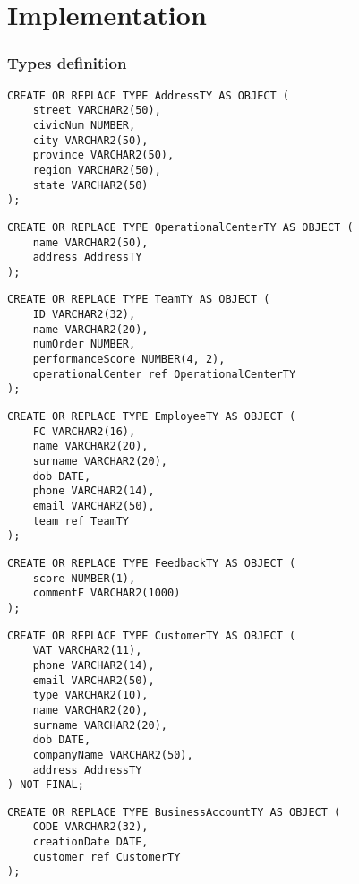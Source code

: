 \chapter{Implementation}

\subsection*{Types definition}
\begin{lstlisting}
CREATE OR REPLACE TYPE AddressTY AS OBJECT (
    street VARCHAR2(50),
    civicNum NUMBER,
    city VARCHAR2(50),
    province VARCHAR2(50),
    region VARCHAR2(50),
    state VARCHAR2(50)
);
\end{lstlisting}

\begin{lstlisting}
CREATE OR REPLACE TYPE OperationalCenterTY AS OBJECT (
    name VARCHAR2(50),
    address AddressTY
);
\end{lstlisting}

\begin{lstlisting}
CREATE OR REPLACE TYPE TeamTY AS OBJECT (
    ID VARCHAR2(32),
    name VARCHAR2(20),
    numOrder NUMBER,
    performanceScore NUMBER(4, 2),
    operationalCenter ref OperationalCenterTY
);
\end{lstlisting}

\begin{lstlisting}
CREATE OR REPLACE TYPE EmployeeTY AS OBJECT (
    FC VARCHAR2(16),
    name VARCHAR2(20),
    surname VARCHAR2(20),
    dob DATE,
    phone VARCHAR2(14),
    email VARCHAR2(50),
    team ref TeamTY
);
\end{lstlisting}

\begin{lstlisting}    
CREATE OR REPLACE TYPE FeedbackTY AS OBJECT (
    score NUMBER(1),
    commentF VARCHAR2(1000)
);
\end{lstlisting}

\begin{lstlisting}    
CREATE OR REPLACE TYPE CustomerTY AS OBJECT (
    VAT VARCHAR2(11),
    phone VARCHAR2(14),
    email VARCHAR2(50),
    type VARCHAR2(10),
    name VARCHAR2(20),
    surname VARCHAR2(20),
    dob DATE,
    companyName VARCHAR2(50),
    address AddressTY
) NOT FINAL;
\end{lstlisting}

\begin{lstlisting}    
CREATE OR REPLACE TYPE BusinessAccountTY AS OBJECT (
    CODE VARCHAR2(32),
    creationDate DATE,
    customer ref CustomerTY
);
\end{lstlisting}

